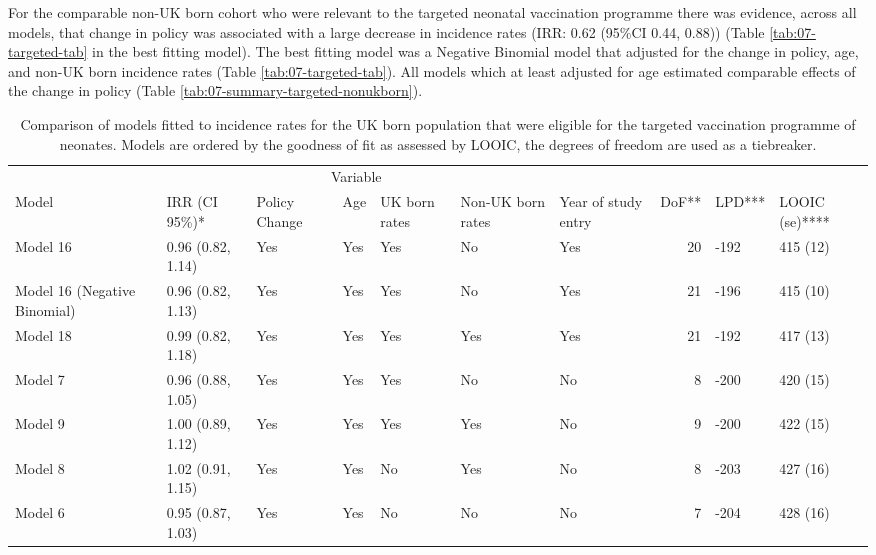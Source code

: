 \documentclass[11pt,twoside]{bristolthesis}
\begin{document}
  For the comparable non-UK born cohort who were relevant to the targeted neonatal vaccination programme there was evidence, across all models, that change in policy was associated with a large decrease in incidence rates (IRR: 0.62 (95\%CI 0.44, 0.88)) (Table \ref{tab:07-targeted-tab} in the best fitting model). The best fitting model was a Negative Binomial model that adjusted for the change in policy, age, and non-UK born incidence rates (Table \ref{tab:07-targeted-tab}). All models which at least adjusted for age estimated comparable effects of the change in policy (Table \ref{tab:07-summary-targeted-nonukborn}).
  \begin{landscape}\begin{table}[!h]
  
  \caption[Comparison of models fitted to incidence rates for the UK born population that were eligible for the targeted vaccination programme of neonates.]{\label{tab:07-summary-targeted-ukborn}Comparison of models fitted to incidence rates for the UK born population that were eligible for the targeted vaccination programme of neonates. Models are ordered by the goodness of fit as assessed by LOOIC, the degrees of freedom are used as a tiebreaker.}
  \centering
  \fontsize{8}{10}\selectfont
  \begin{tabular}{>{\raggedright\arraybackslash}p{3cm}llllllrll}
  \toprule
  \multicolumn{2}{c}{ } & \multicolumn{5}{c}{Variable} & \multicolumn{3}{c}{ } \\
  \cmidrule(l{3pt}r{3pt}){3-7}
  Model & IRR (CI 95\%)* & Policy Change & Age & UK born rates & Non-UK born rates & Year of study entry & DoF** & LPD*** & LOOIC (se)****\\
  \midrule
  Model 16 & 0.96 (0.82, 1.14) & Yes & Yes & Yes & No & Yes & 20 & -192 & 415 (12)\\
  Model 16 (Negative Binomial) & 0.96 (0.82, 1.13) & Yes & Yes & Yes & No & Yes & 21 & -196 & 415 (10)\\
  Model 18 & 0.99 (0.82, 1.18) & Yes & Yes & Yes & Yes & Yes & 21 & -192 & 417 (13)\\
  Model 7 & 0.96 (0.88, 1.05) & Yes & Yes & Yes & No & No & 8 & -200 & 420 (15)\\
  Model 9 & 1.00 (0.89, 1.12) & Yes & Yes & Yes & Yes & No & 9 & -200 & 422 (15)\\
  \addlinespace
  Model 8 & 1.02 (0.91, 1.15) & Yes & Yes & No & Yes & No & 8 & -203 & 427 (16)\\
  Model 6 & 0.95 (0.87, 1.03) & Yes & Yes & No & No & No & 7 & -204 & 428 (16)\\

\end{tabular}
\end{table}
\end{landscape}
\end{document}
